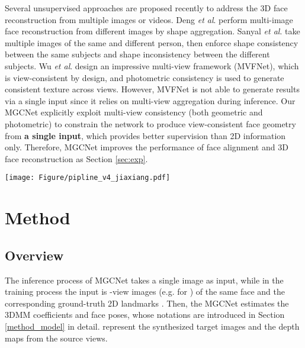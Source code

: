 \documentclass[runningheads]{llncs}
\newcommand{\etal}{\textit{et al}.}
\begin{document}
Several unsupervised approaches \cite{unsuper_mul_ng2019accurate,unsuper_mul_wu2019mvf,unsuper_mul_tewari2019fml,unsuper_mul_sanyal2019learning_ring} are proposed recently to address the 3D face reconstruction from multiple images or videos.
Deng \etal \cite{unsuper_mul_ng2019accurate} perform multi-image face reconstruction from different images by shape aggregation.
Sanyal \etal \cite{unsuper_mul_sanyal2019learning_ring} take multiple images of the same and different person, then enforce shape consistency between the same subjects and shape inconsistency between the different subjects.
Wu \etal \cite{unsuper_mul_wu2019mvf} design an impressive multi-view framework (MVFNet), which is view-consistent by design, and photometric consistency is used to generate consistent texture across views. However, MVFNet is not able to generate results via a single input since it relies on multi-view aggregation during inference.
Our MGCNet explicitly exploit multi-view consistency (both geometric and photometric) to constrain the network to produce view-consistent face geometry from \textbf{a single input}, which provides better supervision than 2D information only. Therefore, MGCNet improves the performance of face alignment and 3D face reconstruction as Section \ref{sec:exp}.





















 \begin{figure*}[t]
	\centering
	\texttt{[image: Figure/pipline\_v4\_jiaxiang.pdf]}
	\caption{The training flow of our MGCNet architecture, which is annotated in Section \ref{sec:method_overview}. The 2D feature loss part is our \textbf{baseline} in Section \ref{sec:method_common_loss}.
		Our novel multi-view geometry consistency loss functions are highlighted as  in Section \ref{sec:method}. }
	\label{fig:pipeline}
\end{figure*}


\section{Method} \label{sec:method}


\subsection{Overview} \label{sec:method_overview}
The inference process of MGCNet takes a single image as input, while in the training process the input is -view images (e.g.  for  ) of the same face and the corresponding ground-truth 2D landmarks .
Then, the MGCNet estimates the 3DMM coefficients and face poses, whose notations are introduced in Section \ref{method_model} in detail.  represent the synthesized target images and the depth maps from the source views.
\end{document}
